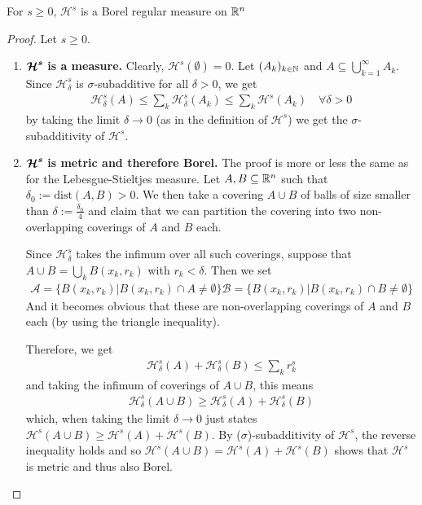 \begin{thm}[]
For $s \geq 0$, $\mathcal{H}^{s}$ is a Borel regular measure on $\mathbb{R}^{n}$
\end{thm}
\begin{proof}
  Let $s \geq 0$. 
  \begin{enumerate}[{(}i{)}]
    \item $\bm{\mathcal{H}^{s}}$ \textbf{is a measure.}
      Clearly, $\mathcal{H}^{s}(\emptyset) = 0$.
      Let $(A_k)_{k \in \mathbb{N}}$ and $A \subseteq \bigcup_{k=1}^{\infty}A_k$.
      Since $\mathcal{H}_{\delta}^{s}$ is $\sigma$-subadditive for all $\delta > 0$, we get
      \begin{align*}
        \mathcal{H}_{\delta}^{s}(A)\leq \sum_{k}\mathcal{H}_{\delta}^{s}(A_k) \leq \sum_{k}\mathcal{H}^{s}(A_k) \quad \forall  \delta > 0
      \end{align*}
      by taking the limit $\delta \to  0$ (as in the definition of $\mathcal{H}^{s}$) we get the $\sigma$-subadditivity of $\mathcal{H}^{s}$.


    \item $\bm{\mathcal{H}^{s}}$ \textbf{is metric and therefore Borel.}
      The proof is more or less the same as for the Lebesgue-Stieltjes measure.
      Let $A,B \subseteq \mathbb{R}^{n}$ such that $\delta_0 := \text{dist}(A,B) > 0$.
      We then take a covering $A \cup B$ of balls of size smaller than $\delta := \tfrac{\delta_0}{4}$ and claim that we can partition the covering into two non-overlapping coverings of $A$ and $B$ each.


      Since $\mathcal{H}_{\delta}^{s}$ takes the infimum over all such coverings, suppose that $A \cup B = \bigcup_{k}B(x_k,r_k)$ with $r_k < \delta$.
      Then we set
      \begin{align*}
        \mathcal{A} = \{B(x_k,r_k) \big\vert B(x_k,r_k) \cap A \neq \emptyset\}
        \mathcal{B} = \{B(x_k,r_k) \big\vert B(x_k,r_k) \cap B \neq \emptyset\}
      \end{align*}
      And it becomes obvious that 
      these are non-overlapping coverings of $A$ and $B$ each (by using the triangle inequality).

      Therefore, we get
      \begin{align*}
        \mathcal{H}_{\delta}^{s}(A) + \mathcal{H}_{\delta}^{s}(B) \leq \sum_{k}r_k^{s}
      \end{align*}
      and taking the infimum of coverings of $A \cup B$, this means
      \begin{align*}
        \mathcal{H}_{\delta}^{s}(A \cup B) \geq \mathcal{H}_{\delta}^{s}(A) + \mathcal{H}_{\delta}^{s}(B) 
      \end{align*}
      which, when taking the limit $\delta \to 0$ just states $\mathcal{H}^{s}(A \cup B) \geq \mathcal{H}^{s}(A) + \mathcal{H}^{s}(B)$.
      By ($\sigma$)-subadditivity of $\mathcal{H}^{s}$, the reverse inequality holds and so $\mathcal{H}^{s}(A \cup B) = \mathcal{H}^{s}(A) + \mathcal{H}^{s}(B)$ shows that $\mathcal{H}^{s}$ is metric and thus also Borel.


\end{enumerate}
\end{proof}
